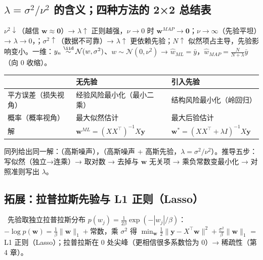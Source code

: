 \subsection{\texorpdfstring{$\lambda=\sigma^2/\nu^2$}{lambda=sigma2/nu2} 的含义；四种方法的 2×2 总结表}
$\nu^2\downarrow$（越信 $\bm w\approx\bm 0$）→ $\lambda\uparrow$ 正则越强，$\nu\to0$ 时 $\bm w^{MAP}\to\bm 0$；$\nu\to\infty$（先验平坦）→ $\lambda\to0$，；$\sigma^2\uparrow$（数据不可靠）→ $\lambda\uparrow$ 更依赖先验；$N\uparrow$ 似然项占主导，先验影响变小。一维：$y_n\overset{\iid}{\sim}\mathcal N(w,\sigma^2)$、$w\sim\mathcal N(0,\nu^2)$ → $\hat w_{ML}=\bar y$，$\hat w_{MAP}=\frac N{N+\lambda}\bar y$（向 0 收缩）。
\begin{center}\small
\begin{tabular}{@{}lll@{}}
\toprule
 & 无先验 & 引入先验 \\
\midrule
平方误差（损失视角）& 经验风险最小化（最小二乘）& 结构风险最小化（岭回归）\\
概率（概率视角）& 最大似然估计 & 最大后验估计 \\
解 & $\bm w^{ML}=(XX^\top)^{-1}X\bm y$ & $\bm w^*=(XX^\top+\lambda I)^{-1}X\bm y$ \\
\bottomrule
\end{tabular}
\end{center}
同列给出同一解：（高斯噪声），（高斯噪声 + 高斯先验，$\lambda=\sigma^2/\nu^2$）。推导五步：写似然（独立→连乘）→ 取对数 → 去掉与 $\bm w$ 无关项 → 乘负常数变最小化 → 对照准则写出 $\lambda$。

\subsection{拓展：拉普拉斯先验与 L1 正则（Lasso）}
\tagext\ 先验取独立拉普拉斯分布 $p(w_j)=\frac1{2\beta}\exp(-|w_j|/\beta)$：$-\log p(\bm w)=\frac1\beta\|\bm w\|_1+$常数，乘 $\sigma^2$ 得 $\min_{\bm w}\frac12\|\bm y-X^\top\bm w\|^2+\frac{\sigma^2}\beta\|\bm w\|_1$ = L1 正则（Lasso）；拉普拉斯在 0 处尖峰（更相信很多系数恰为 0）→ 稀疏性（第 4 章）。
